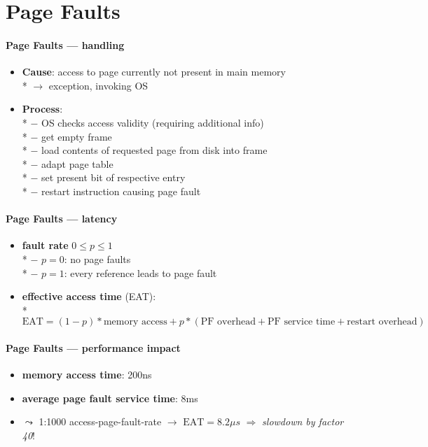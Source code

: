\section{Page Faults}

\paragraph{Page Faults --- handling}
\begin{itemize}
  \item \textbf{Cause}: access to page currently not present in main memory \\*
    $ \to $ exception, invoking OS
  \item \textbf{Process}: \\*
    $ - $ OS checks access validity (requiring additional info) \\*
    $ - $ get empty frame \\*
    $ - $ load contents of requested page from disk into frame \\*
    $ - $ adapt page table \\*
    $ - $ set present bit of respective entry \\*
    $ - $ restart instruction causing page fault
\end{itemize}

\paragraph{Page Faults --- latency}
\begin{itemize}
  \item \textbf{fault rate} $ 0 \leq p \leq 1 $ \\*
    $ - $ $ p = 0 $: no page faults \\*
    $ - $ $ p = 1 $: every reference leads to page fault
  \item \textbf{effective access time} (EAT): \\*
    $ \text{EAT} = (1-p)*\text{memory access} + p*(\text{PF overhead} + \text{PF service time} + \text{restart overhead}) $
\end{itemize}

\paragraph{Page Faults --- performance impact}
\begin{itemize}
  \item \textbf{memory access time}: 200ns
  \item \textbf{average page fault service time}: 8ms
  \item $ \leadsto $ 1:1000 access-page-fault-rate $ \to $ $ \text{EAT} = 8.2\mu s $ $ \Rightarrow $ \emph{slowdown by factor 40}!
\end{itemize}

